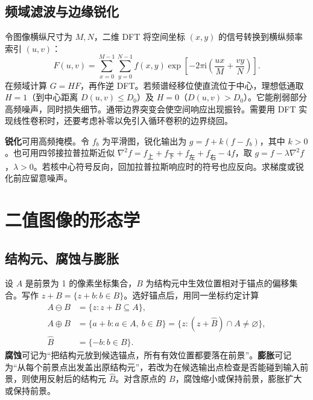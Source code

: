 
\subsection{频域滤波与边缘锐化}

令图像横纵尺寸为 $M,N$，二维 DFT 将空间坐标 $(x,y)$ 的信号转换到横纵频率索引 $(u,v)$：
\[
F(u,v)=\sum_{x=0}^{M-1}\sum_{y=0}^{N-1}f(x,y)
\exp\!\left[-2\pi\mathrm{i}\left(\frac{ux}{M}+\frac{vy}{N}\right)\right].
\]
在频域计算 $G=HF$，再作逆 DFT。若频谱经移位使直流位于中心，理想低通取 $H=1$（到中心距离 $D(u,v)\le D_0$）及 $H=0$（$D(u,v)>D_0$）。它能削弱部分高频噪声，同时损失细节。通带边界突变会使空间响应出现振铃。需要用 DFT 实现线性卷积时，还要考虑补零以免引入循环卷积的边界绕回。

\textbf{锐化}可用高频掩模。令 $f_b$ 为平滑图，锐化输出为 $g=f+k(f-f_b)$，其中 $k>0$。也可用四邻接拉普拉斯近似 $\nabla^2f=f_{\text{上}}+f_{\text{下}}+f_{\text{左}}+f_{\text{右}}-4f$，取 $g=f-\lambda\nabla^2f$，$\lambda>0$。若核中心符号反向，回加拉普拉斯响应时的符号也应反向。求梯度或锐化前应留意噪声。

\section{二值图像的形态学}

\subsection{结构元、腐蚀与膨胀}

设 $A$ 是前景为 1 的像素坐标集合，$B$ 为结构元中生效位置相对于锚点的偏移集合。写作 $z+B=\{z+b:b\in B\}$。选好锚点后，用同一坐标约定计算
\[
\begin{aligned}
A\ominus B&=\{z:z+B\subseteq A\},\\
A\oplus B&=\{a+b:a\in A,\ b\in B\}
=\{z:(z+\widehat B)\cap A\ne\varnothing\},\\
\widehat B&=\{-b:b\in B\}.
\end{aligned}
\]
\textbf{腐蚀}可记为“把结构元放到候选锚点，所有有效位置都要落在前景”。\textbf{膨胀}可记为“从每个前景点出发盖出原结构元”，若改为在候选输出点检查是否能碰到输入前景，则使用反射后的结构元 $\widehat B$。对含原点的 $B$，腐蚀缩小或保持前景，膨胀扩大或保持前景。

